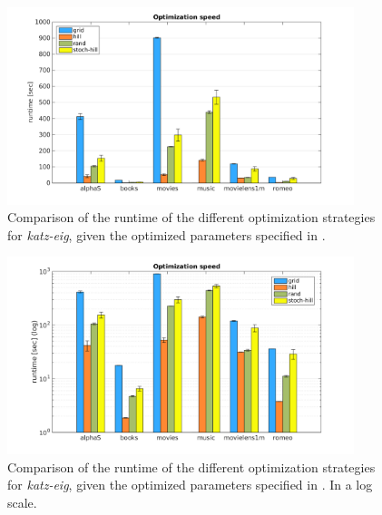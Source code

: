 \begin{figure}[h!]
    \centering
    \includegraphics[width=0.9\textwidth]{fig/comp/comp_katz_speed.png}
    \caption{Comparison of the runtime of the different optimization strategies for \textit{katz-eig}, given the optimized parameters specified in .}
\end{figure}

\begin{figure}[h!]
    \centering
    \includegraphics[width=0.9\textwidth]{fig/comp/comp_katz_speed_log.png}
    \caption{Comparison of the runtime of the different optimization strategies for \textit{katz-eig}, given the optimized parameters specified in . In a log scale.}
\end{figure}

\FloatBarrier
